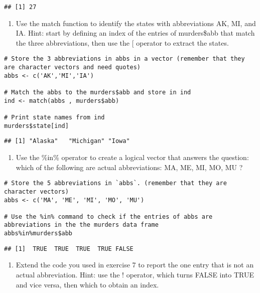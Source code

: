 \documentclass[
]{article}
\providecommand{\tightlist}{%
  \setlength{\itemsep}{0pt}\setlength{\parskip}{0pt}}
\begin{document}
\begin{verbatim}
## [1] 27
\end{verbatim}

\begin{enumerate}
\def\labelenumi{\arabic{enumi}.}
\setcounter{enumi}{5}
\tightlist
\item
  Use the match function to identify the states with abbreviations AK,
  MI, and IA. Hint: start by defining an index of the entries of
  murders\$abb that match the three abbreviations, then use the {[}
  operator to extract the states.
\end{enumerate}

\begin{verbatim}
# Store the 3 abbreviations in abbs in a vector (remember that they are character vectors and need quotes)
abbs <- c('AK','MI','IA')

# Match the abbs to the murders$abb and store in ind
ind <- match(abbs , murders$abb)

# Print state names from ind
murders$state[ind]
\end{verbatim}

\begin{verbatim}
## [1] "Alaska"   "Michigan" "Iowa"
\end{verbatim}

\begin{enumerate}
\def\labelenumi{\arabic{enumi}.}
\setcounter{enumi}{6}
\tightlist
\item
  Use the \%in\% operator to create a logical vector that answers the
  question: which of the following are actual abbreviations: MA, ME, MI,
  MO, MU ?
\end{enumerate}

\begin{verbatim}
# Store the 5 abbreviations in `abbs`. (remember that they are character vectors)
abbs <- c('MA', 'ME', 'MI', 'MO', 'MU')

# Use the %in% command to check if the entries of abbs are abbreviations in the the murders data frame
abbs%in%murders$abb
\end{verbatim}

\begin{verbatim}
## [1]  TRUE  TRUE  TRUE  TRUE FALSE
\end{verbatim}

\begin{enumerate}
\def\labelenumi{\arabic{enumi}.}
\setcounter{enumi}{7}
\tightlist
\item
  Extend the code you used in exercise 7 to report the one entry that is
  not an actual abbreviation. Hint: use the ! operator, which turns
  FALSE into TRUE and vice versa, then which to obtain an index.
\end{enumerate}
\end{document}
